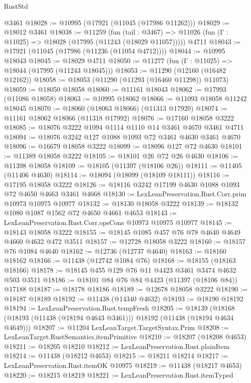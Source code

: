 \begin{lexlean}{RustStd}
\begin{coremodule}
    @3461
@18028 := @10995 (@17921 (@11045 (@17986 @11262)))
@18029 := @18012 @3461
@18038 := @11259
    (fun (tail : @3467) => @11026 (fun (Γ : @11025) => @18028 (@17995 (@11243 (@18029 @11057)))))
    @4711
@18043 := @17921 (@11045 (@17986 (@11236 (@11054 @4712))))
@18044 := @10995 @18043
@18045 := @18029 @4711
@18050 := @11277 (fun (Γ : @11025) => @18044 (@17995 (@11243 @18045)))
@18053 := @11290 (@12160 (@16482 @12162))
@18058 := @18053 (@11290 (@11293 (@16460 @11298)) @11073)
@18059 := @18050 @18058
@18060 := @11161 @18043
@18062 := @17993 (@11086 @18058)
@18063 := @10995 @18062
@18066 := @11093 @18058 @11242 @18045
@18070 := @18060 (@18063 @18066) (@11313 @17920)
@18074 := @11161 @18062 @18066 (@11318 @17992)
@18076 := @17160 @18058 @3222
@18085 := @18076 @3222 @1094 @1114 @1110 @14 @3461 @4670 @3461 @4711
@18094 := @18076 @3242 @127 @1088 @1093 @72 @3461 @4630 @3461 @4670
@18096 := @16679 @18058 @3222
@18099 := @18096 @127 @72 @4630
@18101 := @11389 @18058 @3222
@18105 := @18101 @26 @72 @26 @4630
@18106 := @11398 @18058
@18109 := @18105 (@11397 (@18106 @26))
@18111 := @11405 (@11406 @4630)
@18114 := @18094 (@18099 (@18109 @18111))
@18116 := @17195 @18058 @3222
@18126 := @18116 @3242 @17199 @4630 @1088 @1093 @72 @4650 @4663 @3461 @4668
@18130 := LexLeanPreservation.Rust.Corr.prim @10973 @10975 @10977
@18132 := @18130 @18058 @3222
@18139 := @18132 @1080 @1087 @1562 @72 @4650 @4661 @4653
@18143 := LexLeanPreservation.Rust.Corr.opsCons @10973 @10975 @10977
@18145 := @18143 @18058 @3222
@18155 := @18145 @1085 @457 @76 @78 @4640 @4649 @4660 @4632 @472 @3511
@18157 := @12728 @18058 @3222
@18160 := @18157 @76 @1084 @4640
@18162 := @12736 (@12737 @4640)
@18163 := @18160 @18162
@18166 := @11438 (@12742 @1084 @76)
@18168 := @18155 (@18163 @18166)
@18178 := @18145 @455 @129 @76 @11 @4423 @3461 @3474 @4632 @503 @3511
@18186 := @18101 @84 @76 @84 @4423 (@11397 (@18106 @84)) @17188
@18187 := @18178 @18186
@18189 := @12678 @18058 @3222
@18190 := @18187 @18189
@18192 := @11438 (@14340 @4632)
@18193 := @18190 @18192
@18194 := LexLeanPreservation.Rust.tempFresh
@18205 := @18139
    (@18168 (@18193 (@11438 (@18194 @4643 @3461))) @18192 (@11438 (@18194 @4634 @4649)))
@18207 := @11204 LexLeanTarget.TargetSyntax.Prim
@18208 := LexLeanTarget.RustSemantics.itemPrimitive
@18210 := @18207 (@18208 @4653)
@18211 := @18205 @18210
@18212 := LexLeanPreservation.Rust.plainItem
@18214 := @11438 (@18212 @4653)
@18215 := @18211 @18214
@18217 := LexLeanPreservation.Rust.itemOK @10975
@18219 := @11438 (@18217 @4653)
@18220 := @18215 @18219
@18221 := LexLeanPreservation.Rust.itemTyped

\end{coremodule}
\end{lexlean}
